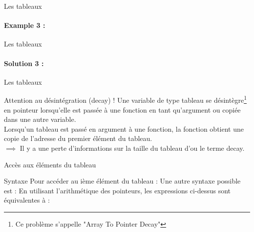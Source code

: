 \documentclass{beamer}
\begin{document}
\begin{darkframes}
  	\begin{frame}{Les tableaux}
  		\framesubtitle{Example 3 : }
  		\arraySizeOfExmplThree
  	\end{frame}
  	\begin{frame}{Les tableaux}
  		\framesubtitle{Solution 3 : }
  		\arraySizeOfExmplThreeSolution
  	\end{frame}
  
  	\begin{frame}{Les tableaux}
  		\begin{alertblock}{Attention au désintégration (decay) !}
  			Une variable de type tableau se \alert{désintègre}\footnote[frame]{Ce problème s'appelle "Array To Pointer Decay"} en pointeur lorsqu'elle est passée à une fonction en tant qu'argument ou copiée dans une autre variable. \\ Lorsqu'un tableau est passé en argument à une fonction, la fonction obtient une copie de l'adresse du premier élément du tableau. \\ 
  			$\implies$ Il y a une perte d'informations sur la taille du tableau d'ou le terme \alert{decay}.
  		\end{alertblock}
  	\end{frame}
  
  	\begin{frame}{Accès aux éléments du tableau}
  		\begin{block}{Syntaxe}
  			Pour accéder au ième élément du tableau :
  			\arrayIndexAccess
  			Une autre syntaxe possible est :
  			\arrayIndexAccessTwo
  			En utilisant l'arithmétique des pointeurs, les expressions ci-dessus sont équivalentes à :
  			\arrayIndexAccessThree
  		\end{block}
  	\end{frame}
	

\end{darkframes}
\end{document}
